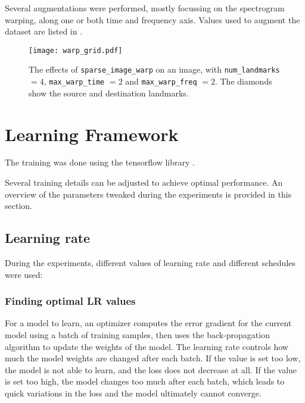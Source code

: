Several augmentations were performed, mostly focussing on the spectrogram
warping, along one or both time and frequency axis.
Values used to augment the dataset are listed in .

\begin{figure}[t!]
    \centering
    \texttt{[image: warp\_grid.pdf]}
    \caption{
    The effects of \texttt{sparse\_image\_warp} on an image, with
\texttt{num\_landmarks} $=4$, \texttt{max\_warp\_time} $=2$ and
\texttt{max\_warp\_freq} $=2$. The diamonds show the source and destination
landmarks.}%
    \label{fig:warp_grid}
\end{figure}

\section{Learning Framework}
\label{sec:learning_framework}


The training was done using the tensorflow library \cite{tensorflow2015-whitepaper}.


Several training details can be adjusted to achieve optimal performance.
An overview of the parameters tweaked during the experiments is provided in
this section.

\subsection{Learning rate}

During the experiments, different values of learning rate and different
schedules were used:

\subsubsection{Finding optimal LR values}
\label{sec:lr_sweep}

For a model to learn, an optimizer computes the error gradient for the current
model using a batch of training samples, then uses the back-propagation
algorithm to update the weights of the model.
The learning rate controls how much the model weights are changed after each batch.
If the value is set too low, the model is not able to learn, and the loss does
not decrease at all.
If the value is set too high, the model changes too much after each batch,
which leads to quick variations in the loss and the model ultimately cannot
converge.

